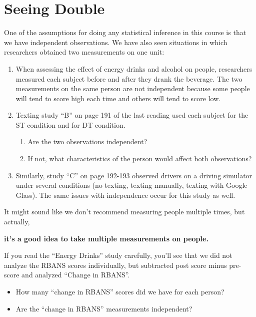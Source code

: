 \def\theTopic{Reading 22 }

\section{ Seeing Double}


One of the assumptions for doing any statistical inference in this
course is that we have independent observations.  
We have also seen situations in which researchers obtained two
measurements on one unit:
\begin{enumerate}
  \item  When assessing the effect of energy drinks and alcohol on
    people, researchers measured each subject before and after they
    drank the beverage.  The two measurements on the same person are
    not independent because some people will tend to score high each
    time and others will tend to score low.
  \item Texting study ``B'' on page 191 of the last reading used each
    subject for the ST  condition and for DT condition.  
    \begin{enumerate}
    \item Are the two  observations independent?\vspace{1cm}
    \item If not, what characteristics of the person would affect both
      observations? \vspace{1cm}
    \end{enumerate}
  \item Similarly, study ``C'' on page 192-193 observed drivers on a
    driving simulator under several conditions (no texting, texting
    manually, texting with Google Glass).  The same issues with
    independence occur for this study as well.
  \end{enumerate}

It might sound like we don't recommend measuring people multiple
times, but actually, \vspace{.4cm}

{\bf it's a good idea to take multiple measurements on people.}\vspace{.4cm}
  

If you read the ``Energy Drinks'' study carefully, you'll see that we
did not analyze the RBANS scores individually, but subtracted post
score minus pre-score and analyzed ``Change in RBANS''.
\begin{itemize}
\item How many ``change in RBANS'' scores did we have for each
  person?\vspace{.5cm}
\item Are the ``change in RBANS'' measurements independent?\vspace{.5cm}
\end{itemize}

